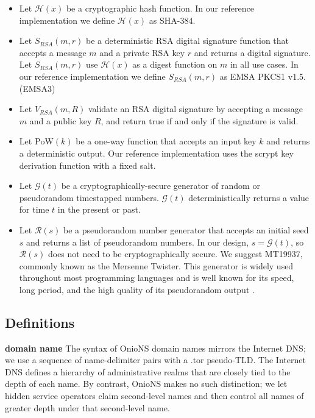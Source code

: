 \documentclass[USenglish,oneside,twocolumn]{article}
\begin{document}
\begin{itemize}
	\item Let $ \mathcal{H}(x) $ be a cryptographic hash function. In our reference implementation we define $ \mathcal{H}(x) $ as SHA-384.
	\item Let $ S_{\mathit{RSA}}(m, r) $ be a deterministic RSA digital signature function that accepts a message $ m $ and a private RSA key $ r $ and returns a digital signature. Let $ S_{\mathit{RSA}}(m, r) $ use $ \mathcal{H}(x) $ as a digest function on $ m $ in all use cases. In our reference implementation we define $ S_{\mathit{RSA}}(m, r) $ as EMSA PKCS1 v1.5. (EMSA3)
	\item Let $ V_{\mathit{RSA}}(m, R) $ validate an RSA digital signature by accepting a message $ m $ and a public key $ R $, and return true if and only if the signature is valid.
	\item Let $ \mathrm{PoW}(k) $ be a one-way function that accepts an input key $ k $ and returns a deterministic output. Our reference implementation uses the scrypt \cite{percival2012scrypt} key derivation function with a fixed salt.
	\item Let $ \mathcal{G}(t) $ be a cryptographically-secure generator of random or pseudorandom timestapped numbers. $ \mathcal{G}(t) $ deterministically returns a value for time $ t $ in the present or past.
	\item Let $ \mathcal{R}(s) $ be a pseudorandom number generator that accepts an initial seed $ s $ and returns a list of pseudorandom numbers. In our design, $ s = \mathcal{G}(t) $, so $ \mathcal{R}(s) $ does not need to be cryptographically secure. We suggest MT19937, commonly known as the Mersenne Twister. This generator is widely used throughout most programming languages and is well known for its speed, long period, and the high quality of its pseudorandom output \cite{matsumoto1998mersenne}.
\end{itemize}

\subsection{Definitions}

\textbf{domain name} The syntax of OnioNS domain names mirrors the Internet DNS; we use a sequence of name-delimiter pairs with a .tor pseudo-TLD. The Internet DNS defines a hierarchy of administrative realms that are closely tied to the depth of each name. By contrast, OnioNS makes no such distinction; we let hidden service operators claim second-level names and then control all names of greater depth under that second-level name.
\end{document}
